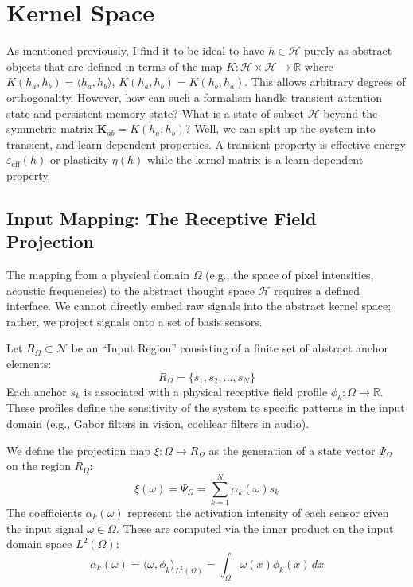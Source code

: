\documentclass[twocolumn, 10pt]{article}
\begin{document}
\section{Kernel Space}
As mentioned previously, I find it to be ideal to have $h \in \mathcal{H}$ purely as abstract objects that are defined in terms of the map $K : \mathcal{H} \times \mathcal{H} \to \mathbb{R}$ where $K(h_a,h_b) = \langle h_a , h_b \rangle$,  $K(h_a, h_b) = K(h_b, h_a)$. This allows arbitrary degrees of orthogonality. However, how can such a formalism handle transient attention state and persistent memory state? What is a state of subset $\mathcal{H}$ beyond the symmetric matrix $\mathbf{K}_{ab} = K(h_a,h_b)$? Well, we can split up the system into transient, and learn dependent properties. A transient property is effective energy $\varepsilon_{\text{eff}}(h)$ or plasticity $\eta(h)$ while the kernel matrix is a learn dependent property.

\subsection{Input Mapping: The Receptive Field Projection}
The mapping from a physical domain $\Omega$ (e.g., the space of pixel intensities, acoustic frequencies) to the abstract thought space $\mathcal{H}$ requires a defined interface. We cannot directly embed raw signals into the abstract kernel space; rather, we project signals onto a set of basis sensors.

Let $R_\Omega \subset \mathcal{N}$ be an ``Input Region'' consisting of a finite set of abstract anchor elements:
\begin{equation}
    R_\Omega = \{ s_1, s_2, \dots, s_N \}
\end{equation}
Each anchor $s_k$ is associated with a physical receptive field profile $\phi_k : \Omega \to \mathbb{R}$. These profiles define the sensitivity of the system to specific patterns in the input domain (e.g., Gabor filters in vision, cochlear filters in audio).

We define the projection map $\xi : \Omega \to R_\Omega$ as the generation of a state vector $\Psi_\Omega$ on the region $R_\Omega$:
\begin{equation}
    \xi(\omega) = \Psi_\Omega = \sum_{k=1}^{N} \alpha_k(\omega) s_k
\end{equation}
The coefficients $\alpha_k(\omega)$ represent the activation intensity of each sensor given the input signal $\omega \in \Omega$. These are computed via the inner product on the input domain space $L^2(\Omega)$:
\begin{equation}
    \alpha_k(\omega) = \langle \omega, \phi_k \rangle_{L^2(\Omega)} = \int_{\Omega} \omega(x) \phi_k(x) \, dx
\end{equation}
\end{document}
